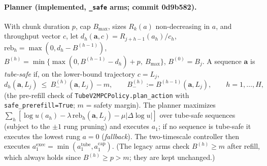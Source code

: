 \paragraph{Planner (implemented, \texttt{\_safe} arms; commit 0d9b582).} With chunk duration $p$, cap $B_{\max}$,
sizes $R_k(a)$ non-decreasing in $a$, and throughput vector $c$, let $d_h(\mathbf a,c)=R_{j+h-1}(a_h)/c_h$,
$\mathrm{reb}_h=\max(0,d_h-B^{(h-1)})$, $B^{(h)}=\min\{\max(0,B^{(h-1)}-d_h)+p,\ B_{\max}\}$, $B^{(0)}=B_j$.
A sequence $\mathbf a$ is \emph{tube-safe} if, on the lower-bound trajectory $c=L_j$,
\begin{equation}\label{eq:safe}
 d_h(\mathbf a,L_j)\ \le\ B^{(h)}_{-}(\mathbf a,L_j) - m,\qquad B^{(h)}_{-}:=B^{(h-1)}(\mathbf a,L_j),\qquad h=1,\dots,H,
\end{equation}
(the pre-refill check of \texttt{TubeV2MPCPolicy.plan\_action} with \texttt{safe\_prerefill=True}; $m$ = safety margin).
The planner maximizes $\sum_h[\log u(a_h)-\lambda\,\mathrm{reb}_h(\mathbf a,L_j)-\mu|\Delta\log u|]$ over tube-safe
sequences (subject to the $\pm1$ rung pruning) and executes $a_1$; if no sequence is tube-safe it executes the lowest
rung $a=0$ (\emph{fallback}). The two-timescale controller then executes $a^{\mathrm{exec}}_1=\min(a^{\mathrm{tube}}_1,a^{\mathrm{cap}}_1)$.
(The legacy arms check $B^{(h)}\ge m$ after refill, which always holds since $B^{(h)}\ge p>m$; they are kept unchanged.)

